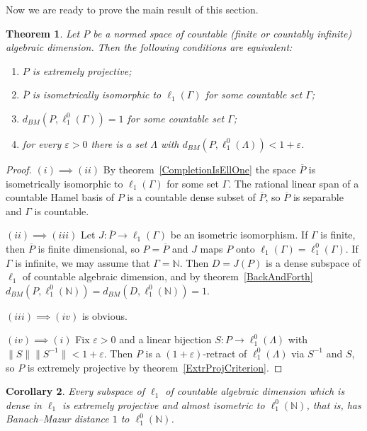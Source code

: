 \documentclass[12pt]{article}
\newtheorem{theorem}{Theorem}[section]
\newtheorem{corollary}[theorem]{Corollary}
\newcommand{\lo}[1]{\ell_1^0(#1)}
\newcommand{\ellone}[1]{\ell_1(#1)}
\newcommand{\norm}[1]{\lVert #1\rVert}
\newcommand{\BM}{d_{BM}}
\begin{document}
Now we are ready to prove the main result of this section.

\begin{theorem}\label{MainTheorem} Let $P$ be a normed space of countable
    (finite or countably infinite) algebraic dimension. Then the following
    conditions are equivalent:
    \begin{enumerate}[label = (\roman*)]
        \item $P$ is extremely projective;
        \item $\overline{P}$ is isometrically isomorphic to $\ellone{\Gamma}$
              for some countable set $\Gamma$;
        \item $\BM(P,\lo{\Gamma})=1$ for some countable set $\Gamma$;
        \item for every $\varepsilon>0$ there is a set $\Lambda$ with
              $\BM(P,\lo{\Lambda})<1+\varepsilon$.
    \end{enumerate}
\end{theorem}
\begin{proof} $(i)\implies(ii)$ By theorem~\ref{CompletionIsEllOne} the space
    $\overline{P}$ is isometrically isomorphic to $\ellone{\Gamma}$ for some
    set $\Gamma$. The rational linear span of a countable Hamel basis of $P$
    is a countable dense subset of $\overline{P}$, so $\overline{P}$ is
    separable and $\Gamma$ is countable.

    $(ii)\implies(iii)$ Let $J:\overline{P}\to\ellone{\Gamma}$ be an isometric
    isomorphism. If $\Gamma$ is finite, then $\overline{P}$ is finite
    dimensional, so $P=\overline{P}$ and $J$ maps $P$ onto
    $\ellone{\Gamma}=\lo{\Gamma}$. If $\Gamma$ is infinite, we may assume that
    $\Gamma=\mathbb{N}$. Then $D=J(P)$ is a dense subspace of $\ell_1$ of
    countable algebraic dimension, and by theorem~\ref{BackAndForth}
    $\BM(P,\lo{\mathbb{N}})=\BM(D,\lo{\mathbb{N}})=1$.

    $(iii)\implies(iv)$ is obvious.

    $(iv)\implies(i)$ Fix $\varepsilon>0$ and a linear bijection
    $S:P\to\lo{\Lambda}$ with $\norm{S}\norm{S^{-1}}<1+\varepsilon$. Then $P$
    is a $(1+\varepsilon)$-retract of $\lo{\Lambda}$ via $S^{-1}$ and $S$, so
    $P$ is extremely projective by theorem~\ref{ExtrProjCriterion}.
\end{proof}

\begin{corollary}\label{DenseCountableSubspaces} Every subspace of $\ell_1$
    of countable algebraic dimension which is dense in $\ell_1$ is extremely
    projective and almost isometric to $\lo{\mathbb{N}}$, that is, has
    Banach--Mazur distance $1$ to $\lo{\mathbb{N}}$.
\end{corollary}
\end{document}
